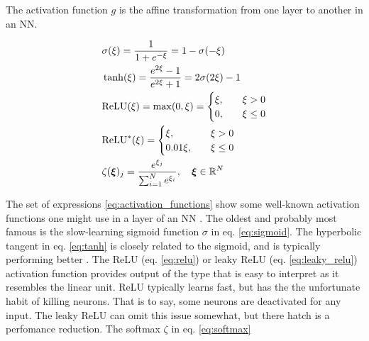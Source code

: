 
    
    The activation function $g$ is the affine transformation from one layer to another in an NN.   

    \begin{subequations}\label{eq:activation_functions}
        \begin{align}
            &\sigma(\xi) = \frac{1}{1+e^{-\xi}} = 1- \sigma(-\xi) \label{eq:sigmoid}\\
            &\tanh(\xi) = \frac{e^{2\xi}-1}{e^{2\xi}+1} = 2\sigma(2\xi) -1\label{eq:tanh} \\
            &\mathrm{ReLU}(\xi) = \max(0,\xi) = \begin{cases}
                \xi,\quad &\xi >0 \\
                0,\quad &\xi \leq 0
            \end{cases} \label{eq:relu}\\
            &\mathrm{ReLU}^*(\xi)  = \begin{cases}
                \xi,\quad &\xi >0 \\
                0.01\xi,\quad &\xi \leq 0
            \end{cases} \label{eq:leaky_relu} \\
            &\zeta(\svec{\xi})_j = \frac{e^{\xi_j}}{\sum\nolimits_{i=1}^{N}e^{\xi_i}}, \quad \svec{\xi} \in \RR[N]\label{eq:softmax}
        \end{align}
    \end{subequations}

    The set of expressions \eqref{eq:activation_functions} show some well-known activation functions one might use in a layer of an NN . The oldest and probably most famous is the slow-learning sigmoid function $\sigma$ in eq. \eqref{eq:sigmoid}. The hyperbolic tangent in eq. \eqref{eq:tanh} is closely related to the sigmoid, and is typically performing better \citep{Goodfellow2016}. The ReLU (eq. \eqref{eq:relu}) or leaky ReLU (eq. \eqref{eq:leaky_relu}) activation function provides output of the type that is easy to interpret as it resembles the linear unit. ReLU typically learns fast, but has the the unfortunate habit of killing neurons. That is to say, some neurons are deactivated for any input. The leaky ReLU can omit this issue somewhat, but there hatch is a perfomance reduction. The softmax $\zeta$ in eq. \eqref{eq:softmax} \fillertext

